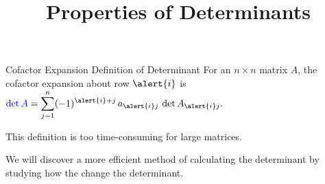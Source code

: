 \documentclass[xcolor=dvipsnames,aspectratio=169,t]{beamer}
\title{Properties of Determinants}
\begin{document}
\maketitle

\begin{frame}{Cofactor Expansion Definition of Determinant}
  \bbox
  {\small
  For an $n \times n$ matrix $A$, the cofactor expansion about row $\alert{i}$ is
  $\blue{\det A} = \displaystyle\sum_{j=1}^n (-1)^{\alert{i}+j} \, a_{\alert{i}j} \, \det A_{\alert{i}j}.$
  }
  \ebox
  \bigskip
  
  \pause
  This  definition is \alert{too time-consuming} for large matrices.
  \vspace*{2em}
  
  We will discover a more efficient method of calculating the determinant
  by studying how the  change the determinant.
\end{frame}
\end{document}
